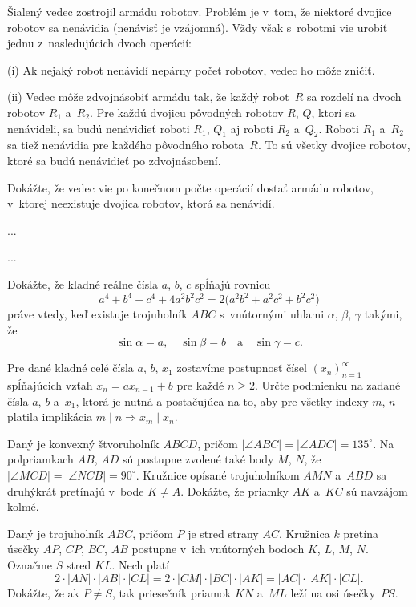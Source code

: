 {%
Šialený vedec zostrojil armádu robotov. Problém je v~tom, že niektoré dvojice robotov sa nenávidia (nenávisť je vzájomná). Vždy však s~robotmi vie urobiť jednu z~nasledujúcich dvoch operácií:
\item{(i)} Ak nejaký robot nenávidí nepárny počet robotov, vedec ho môže zničiť.
\item{(ii)} Vedec môže zdvojnásobiť armádu tak, že každý robot~$R$ sa rozdelí na dvoch robotov $R_1$ a~$R_2$. Pre každú dvojicu pôvodných robotov $R$, $Q$, ktorí sa nenávideli, sa budú nenávidieť roboti $R_1$, $Q_1$ aj roboti $R_2$ a~$Q_2$. Roboti $R_1$ a~$R_2$ sa tiež nenávidia pre každého pôvodného robota~$R$. To sú všetky dvojice robotov, ktoré sa budú nenávidieť po zdvojnásobení.

Dokážte, že vedec vie po konečnom počte operácií dostať armádu robotov, v~ktorej neexistuje dvojica robotov, ktorá sa nenávidí.}

{%
...}

{%
...}

{%
Dokážte, že kladné reálne čísla $a$, $b$, $c$ spĺňajú rovnicu
$$
a^4+b^4+c^4+4a^2b^2c^2=2\bigl(a^2b^2+a^2c^2+b^2c^2\bigr)
$$
práve vtedy, keď existuje trojuholník $ABC$ s~vnútornými uhlami
$\alpha$, $\beta$, $\gamma$ takými, že
$$
\sin\alpha=a,\quad \sin\beta=b\quad\text{a}\quad\sin\gamma=c.
$$
}

{%
Pre dané kladné celé čísla $a$, $b$, $x_1$ zostavíme
postupnosť čísel $(x_n)_{n=1}^{\infty}$ spĺňajúcich
vzťah $x_n=ax_{n-1}+b$ pre každé $n\ge2$. Určte podmienku na zadané čísla
$a$, $b$ a~$x_1$, ktorá je nutná a postačujúca na to, aby pre
všetky indexy $m$, $n$ platila implikácia ${m\mid n}\Rightarrow x_m\mid
x_n$.
}

{%
Daný je konvexný štvoruholník $ABCD$, pričom $|\angle ABC| = |\angle ADC| = 135^{\circ}$. Na polpriamkach $AB$, $AD$ sú postupne zvolené také body $M$, $N$, že $|\angle MCD| = |\angle NCB| = 90^{\circ}$. Kružnice opísané trojuholníkom $AMN$ a~$ABD$ sa druhýkrát pretínajú v~bode $K\ne A$. Dokážte, že priamky $AK$ a~$KC$ sú navzájom kolmé.
}

{%
Daný je trojuholník $ABC$, pričom $P$ je stred strany $AC$. Kružnica $k$ pretína úsečky $AP$, $CP$, $BC$, $AB$ postupne v~ich vnútorných bodoch $K$, $L$, $M$, $N$.
Označme $S$ stred $KL$. Nech platí
$$
2\cdot|AN|\cdot |AB|\cdot |CL| = 2\cdot|CM|\cdot |BC| \cdot |AK| = |AC|\cdot |AK| \cdot |CL|.
$$
Dokážte, že ak $P\ne S$, tak priesečník priamok $KN$ a~$ML$ leží na osi úsečky~$PS$.
}

